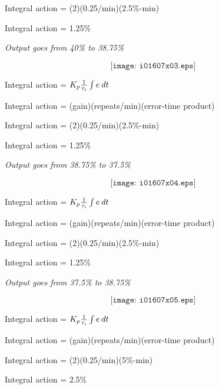 Integral action = (2)(0.25/min)(2.5\%-min)
 
\vskip 10pt

Integral action = 1.25\%
 
\vskip 10pt

\noindent
{\it Output goes from 40\% to 38.75\%}

$$\texttt{[image: i01607x03.eps]}$$

\filbreak 

Integral action = $K_p {1\over \tau_i} \int e \> dt$
 
\vskip 10pt

Integral action = (gain)(repeats/min)(error-time product)
 
\vskip 10pt

Integral action = (2)(0.25/min)(2.5\%-min)
 
\vskip 10pt

Integral action = 1.25\%
 
\vskip 10pt
 
\noindent
{\it Output goes from 38.75\% to 37.5\%}
 
$$\texttt{[image: i01607x04.eps]}$$

\filbreak 

Integral action = $K_p {1\over \tau_i} \int e \> dt$
 
\vskip 10pt

Integral action = (gain)(repeats/min)(error-time product)
 
\vskip 10pt

Integral action = (2)(0.25/min)(2.5\%-min)
 
\vskip 10pt

Integral action = 1.25\%
 
\vskip 10pt
 
\noindent
{\it Output goes from 37.5\% to 38.75\%}
 
$$\texttt{[image: i01607x05.eps]}$$

\filbreak 

Integral action = $K_p {1\over \tau_i} \int e \> dt$
 
\vskip 10pt

Integral action = (gain)(repeats/min)(error-time product)
 
\vskip 10pt

Integral action = (2)(0.25/min)(5\%-min)
 
\vskip 10pt

Integral action = 2.5\%
 
\vskip 10pt
 

